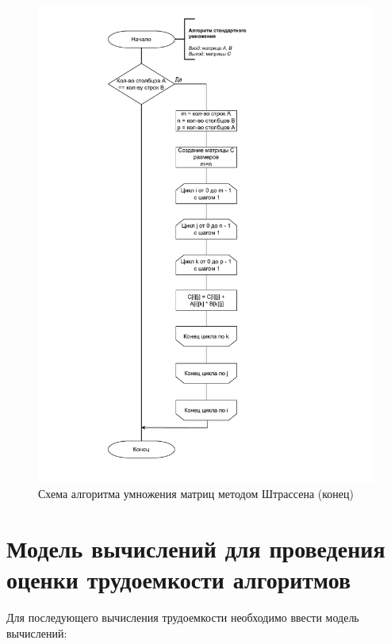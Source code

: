 \begin{figure}[h]
	\centering
	\includegraphics[height=0.9\textheight, page=7]{img/algorithms.pdf}
	\caption{Схема алгоритма умножения матриц методом Штрассена (конец)}
	\label{fig:Str2}
\end{figure}

\clearpage

\section{Модель вычислений для проведения оценки трудоемкости алгоритмов}
Для последующего вычисления трудоемкости необходимо ввести модель вычислений:

